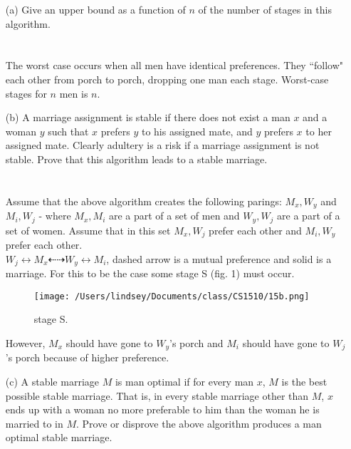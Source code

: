 \documentclass[10pt]{article}
\begin{document}
			\begin{enumerate}
				\item[(a)]  Give an upper bound as a function of $n$ of the number of stages in this algorithm.\\
										\\
										\\
										The worst case occurs when all men have identical preferences. They ``follow" each other
										from porch to porch, dropping one man each stage. Worst-case stages for $n$ men is $n$.\\
				\item[(b)]  A marriage assignment is stable if there does not exist a man $x$ and a woman $y$  such that $x$
										prefers $y$ to his assigned mate, and $y$ prefers $x$ to her assigned mate. Clearly adultery is a risk if
										a marriage assignment is not stable. Prove that this algorithm leads to a stable marriage.\\
										\\
										\\
										Assume that the above algorithm creates the following parings: $M_x, W_y$ and $M_i, W_j$ - where $M_x, M_i$ are
										a part of a set of men and $W_y, W_j$ are a part of a set of women. Assume that in this set $M_x, W_j$ prefer
										each other and $M_i, W_y$ prefer each other.\\
										$W_j \leftrightarrow M_x \dashleftarrow \dashrightarrow W_y \leftrightarrow M_i$, dashed arrow is a mutual 
										preference and solid is a marriage. For this to be the case some stage S (fig. 1) must occur.\\
										\begin{figure}[h]
											\centering
												\texttt{[image: /Users/lindsey/Documents/class/CS1510/15b.png]}
											  \caption{stage S.}
										\end{figure}
										\linebreak
										However, $M_x$ should have gone to $W_y$'s porch and $M_i$ should have gone to $W_j$'s porch because of higher
										preference. 
				\item[(c)]  A stable marriage $M$ is man optimal if for every man $x$, $M$ is the best possible stable marriage.
										That is, in every stable marriage other than $M$, $x$ ends up with a woman no more preferable to
										him than the woman he is married to in $M$.  Prove or disprove the above algorithm produces a
										man optimal stable marriage.

\end{enumerate}
\end{document}
